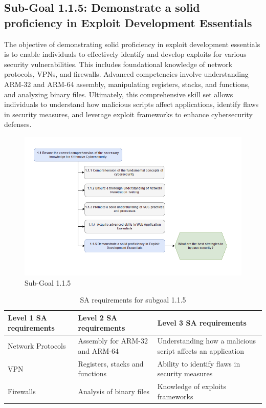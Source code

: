 \newpage
\subsection{Sub-Goal 1.1.5: Demonstrate a solid proficiency in Exploit Development Essentials}
The objective of demonstrating solid proficiency in exploit development essentials is to enable individuals to effectively identify and develop exploits for various security vulnerabilities. This includes foundational knowledge of network protocols, VPNs, and firewalls. Advanced competencies involve understanding ARM-32 and ARM-64 assembly, manipulating registers, stacks, and functions, and analyzing binary files. Ultimately, this comprehensive skill set allows individuals to understand how malicious scripts affect applications, identify flaws in security measures, and leverage exploit frameworks to enhance cybersecurity defenses.

\begin{figure}[H]
  \centering
  \includegraphics[width=\textwidth]{./assets/subgoal_1.1.5.png}
  \caption{Sub-Goal 1.1.5}
  \label{fig:subgoal1.1.5}
\end{figure}

\begin{table}[H]
    \begin{center}
    \begin{tabular}{ | m{5cm} | m{5cm}| m{5cm} | } 
      \hline
      \textbf{Level 1 SA requirements} & \textbf{Level 2 SA requirements}  & \textbf{Level 3 SA requirements}  \\ 
      \hline
      Network Protocols & Assembly for ARM-32 and ARM-64 & Understanding how a malicious script affects an application\\ 
      \hline
      VPN &  Registers, stacks and functions & Ability to identify flaws in security measures\\ 
      \hline
      Firewalls & Analysis of binary files & Knowledge of exploits frameworks\\  
      \hline
    \end{tabular}
    \end{center}
    \caption{SA requirements for subgoal 1.1.5}
    \end{table}

